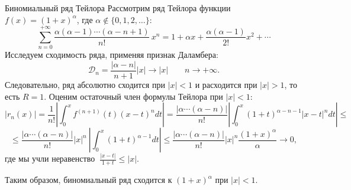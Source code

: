 \documentclass[8pt]{beamer}
\begin{document}
\begin{frame}{Биномиальный ряд Тейлора}
Рассмотрим ряд Тейлора функции $ f(x) =(1+x)^\alpha$, где $\alpha\notin\{0,1,2,\ldots\}$:
$$\sum_{n=0}^{+\infty}\frac{\alpha (\alpha-1)\cdots(\alpha-n+1)}{n!}\, x^n = 1+\alpha x+\frac{\alpha(\alpha-1)}{2!}x^2+\cdots$$
Исследуем сходимость ряда, применяя признак Даламбера:
$$\mathcal{D}_n = \frac{|\alpha -n|}{n+1} |x|\to |x|\qquad n\to+\infty.$$
Следовательно, ряд абсолютно сходится при $|x|<1$ и расходится при $|x|>1$, то есть $R=1$. Оценим остаточный член формулы Тейлора при $|x|<1$:
$$|r_n(x)|=\frac{1}{n!}\left|\int_0^x f^{(n+1)}(t)(x-t)^n dt\right|=
\frac{|\alpha \cdots(\alpha-n)|}{n!} \left|\int_0^x (1+t)^{\alpha-n-1} |x-t|^n dt\right| \le $$
$$\le \frac{|\alpha \cdots(\alpha-n)|}{n!} |x|^n\  \left|\int_0^x (1+t)^{\alpha-1} dt\right|\le \frac{|\alpha \cdots(\alpha-n)|}{n!} |x|^n \frac{(1+x)^{\alpha}}{\alpha}\to 0,$$
где мы учли неравенство $\ \displaystyle \frac{|x-t|}{1+t} \le |x|$.

Таким образом, биномиальный ряд сходится к $(1+x)^\alpha$ при $|x|<1$.
\end{frame}
\end{document}
